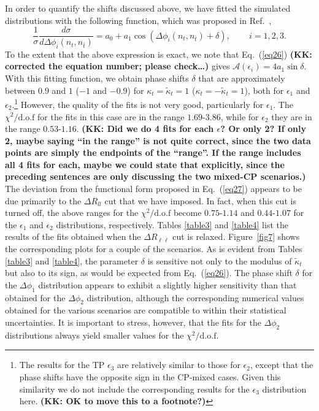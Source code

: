 \documentclass[aps,preprint,tightenlines,floatfix,superscriptaddress,nofootinbib,showpacs]{revtex4-1}
\def\beq{\begin{equation}}
\def\eeq{\end{equation}}
\def\tbar{\bar{t}}
\def\kp{\kappa_t}
\def\kpt{\tilde{\kappa}_t}
\begin{document}
In order to quantify the shifts discussed above, we have fitted
the simulated distributions with the following function, which was proposed in
Ref.~\cite{Ellis},
%
\beq
\label{eq27}
\frac{1}{\sigma}\frac{d\sigma}{d\Delta\phi_i(n_t,n_{\tbar})}=a_0 + a_1\cos(\Delta\phi_i(n_t,n_{\tbar})+\delta),\qquad\, i=1,2,3.
\eeq
%
To the extent that the above expression is exact, we note that
Eq.~(\ref{eq26}) {\bf (KK: corrected the equation number; please check\ldots )}
gives $\mathcal{A}(\epsilon_i)=4a_1 \sin\delta$. With
this fitting function, we obtain phase shifts $\delta$ that
are approximately between
$0.9$ and $1$ ($-1$ and $-0.9$) for $\kp=\kpt=1$ ($\kp=-\kpt=1$), both
for $\epsilon_1$ and $\epsilon_2$.\footnote{The results for the
  TP $\epsilon_3$ are relatively similar to
  those for $\epsilon_2$, except that the phase shifts have the opposite
  sign in the $\mathrm{CP}$-mixed cases.  Given this similarity
  we do not include the corresponding results for the $\epsilon_3$ distribution
  here. {\bf (KK: OK to move this to a footnote?)}}  However, the quality of the fits is
not very good, particularly for $\epsilon_1$.  The
$\chi^2/\mathrm{d.o.f}$ for the fits in this case are in the range
$1.69$-$3.86$, while for $\epsilon_2$ they are in the range $0.53$-$1.16$.
{\bf (KK: Did we do 4 fits for each $\epsilon$?  Or only 2?  If only 2, maybe
  saying ``in the range'' is not quite correct, since the two
  data points are simply the endpoints of the ``range''.  If
  the range includes all 4 fits for each, maybe we could state that
  explicitly, since the preceding sentences are only discussing the two
  mixed-CP scenarios.)}
The deviation from the functional
form proposed in Eq.~(\ref{eq27}) appears to be due primarily to the $\Delta
R_{ll}$ cut that we have imposed. In fact, when this cut is turned off, the
above ranges for the $\chi^2/\mathrm{d.o.f}$ become $0.75$-$1.14$ and
$0.44$-$1.07$ for the $\epsilon_1$ and $\epsilon_2$ distributions,
respectively. Tables \ref{table3} and \ref{table4} list the
results of the fits obtained when the $\Delta R_{\ell\ell}$ cut is
relaxed.  Figure~\ref{fig7} shows the corresponding
plots for a couple of the scenarios.
As is evident from Tables \ref{table3} and \ref{table4}, the
parameter $\delta$ is sensitive not only to the modulus of $\kpt$ but
also to its sign, as would be expected from Eq.~(\ref{eq26}).
The phase shift $\delta$ for the $\Delta\phi_1$ distribution
appears to exhibit a slightly higher sensitivity than
that obtained for the $\Delta\phi_2$ distribution, although the corresponding
numerical values obtained for the various scenarios are
compatible to within their statistical uncertainties. It is
important to stress, however, that the fits for the $\Delta\phi_2$ distributions
always yield smaller values for the $\chi^2/\mathrm{d.o.f}$.
\end{document}

